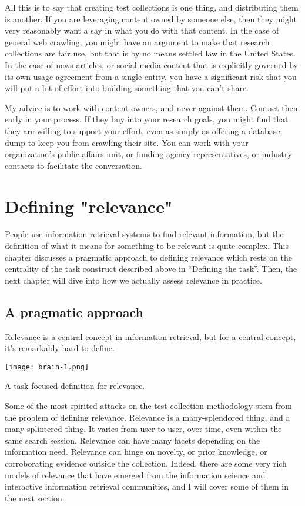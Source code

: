 \documentclass[nobib]{tufte-book}
\begin{document}
All this is to say that creating test collections is one thing, and distributing them is another.  If you are leveraging content owned by someone else, then they might very reasonably want a say in what you do with that content.  In the case of general web crawling, you might have an argument to make that research collections are fair use, but that is by no means settled law in the United States.  In the case of news articles, or social media content that is explicitly governed by its own usage agreement from a single entity, you have a significant risk that you will put a lot of effort into building something that you can't share.

My advice is to work with content owners, and never against them.  Contact them early in your process.  If they buy into your research goals, you might find that they are willing to support your effort, even as simply as offering a database dump to keep you from crawling their site.  You can work with your organization's public affairs unit, or funding agency representatives, or industry contacts to facilitate the conversation.

\chapter{Defining "relevance"}

People use information retrieval systems to find relevant information, but the definition of what it means for something to be relevant is quite complex.  This chapter discusses a pragmatic approach to defining relevance which rests on the centrality of the task construct described above in ``Defining the task''.  Then, the next chapter will dive into how we actually assess relevance in practice.

\section{A pragmatic approach}

Relevance is a central concept in information retrieval, but for a central concept, it's remarkably hard to define. 
\begin{marginfigure}
    \texttt{[image: brain-1.png]}
    \caption{A task-focused definition for relevance.}
\end{marginfigure}
Some of the most spirited attacks on the test collection methodology stem from the problem of defining relevance.  Relevance is a many-splendored thing, and a many-splintered thing.  It varies from user to user, over time, even within the same search session.  Relevance can have many facets depending on the information need.  Relevance can hinge on novelty, or prior knowledge, or corroborating evidence outside the collection.  Indeed, there are some very rich models of relevance that have emerged from the information science and interactive information retrieval communities, and I will cover some of them in the next section.
\end{document}
